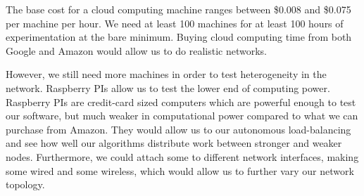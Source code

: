 \documentclass[12pt,a4paper]{article}
\begin{document}
The base cost for a cloud computing machine ranges between \$0.008 and \$0.075 per machine per hour.
We need at least 100 machines for at least 100 hours of experimentation at the bare minimum.
Buying cloud computing time from both Google and Amazon would allow us to do realistic networks.

However, we still need more machines in order to test heterogeneity in the network.
Raspberry PIs allow us to test the lower end of computing power.
Raspberry PIs are credit-card sized computers which are powerful enough to test our software, but much weaker in computational power compared to what we can purchase from Amazon.
They would allow us to our autonomous load-balancing and see how well our algorithms distribute work between stronger and weaker nodes.
Furthermore, we could attach some to different network interfaces, making some wired and some wireless, which would allow us to further vary our network topology.
%
\end{document}
